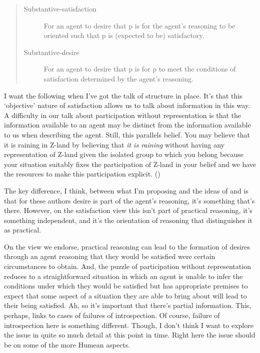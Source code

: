 \documentclass[10pt]{article}
\begin{document}
\begin{quote}
  \begin{description}
  \item[Substantive-satisfaction] For an agent to desire that p is for the agent's reasoning to be oriented such that p is (expected to be) satisfactory.
  \item[Substantive-desire] For an agent to desire that p is for p to meet the conditions of satisfaction determined by the agent's reasoning.
  \end{description}

\end{quote}








{\color{red}
  I want the following when I've got the talk of structure in place.
  It's that this `objective' nature of satisfaction allows us to talk about information in this way.
}
A difficulty in our talk about participation without representation is that the information available to an agent may be distinct from the information available to us when describing the agent.
Still, this parallels belief.
You may believe that it is raining in Z-land by believing that \emph{it is raining} without having any representation of Z-land given the isolated group to which you belong because your situation suitably fixes the participation of Z-land in your belief and we have the resources to make this participation explicit.
(\cite[cf.][]{Perry:1986aa})


{\color{red}
  The key difference, I think, between what I'm proposing and the ideas of \citeauthor{Pettit:1990aa} and \citeauthor{Schroeder:2007aa} is that for these authors desire is part of the agent's reasoning, it's something that's there.
  However, on the satisfaction view this isn't part of practical reasoning, it's something independent, and it's the orientation of reasoning that distinguishes it as practical.
}


On the view we endorse, practical reasoning can lead to the formation of desires through an agent reasoning that they would be satisfied were certain circumstances to obtain.
And, the puzzle of participation without representation reduces to a straightforward situation in which an agent is unable to infer the conditions under which they would be satisfied but has appropriate premises to expect that some aspect of a situation they are able to bring about will lead to their being satisfied.
{\color{red}
  Ah, so it's important that there's partial information.
  This, perhaps, links to cases of failures of introspection.
  Of course, failure of introspection here is something different.
  Though, I don't think I want to explore the issue in quite so much detail at this point in time.
  Right here the issue should be on some of the more Humean aspects.
}
\end{document}
